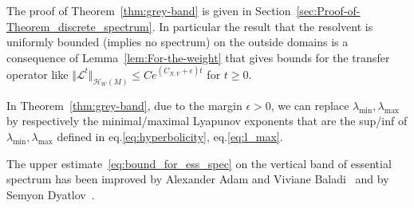 \documentclass[AHL,Unicode,longabstracts,published]{cedram}
\newcommand{\clH}{\mathcal{H}}
\newcommand{\clL}{\mathcal{L}}
\newcommand{\clH}{\mathcal{H}}
\begin{document}
The proof of Theorem~\ref{thm:grey-band} is given in Section~\ref{sec:Proof-of-Theorem_discrete_spectrum}. In particular the result that the resolvent is uniformly bounded (implies no spectrum) on the outside domains is a consequence of Lemma~\ref{lem:For-the-weight} that gives bounds for the transfer operator like $\Vert \clL^{t}\Vert _{\clH _{W}(M)}\leq Ce^{(C_{X,V}+\epsilon)t}$ for $t\geq0$.

\begin{rema}
In Theorem~\ref{thm:grey-band}, due to the margin $\epsilon>0$, we can replace $\lambda_{\min},\lambda_{\max}$ by respectively the minimal/maximal Lyapunov exponents that are the sup/inf of $\lambda_{\min},\lambda_{\max}$ defined in eq.\eqref{eq:hyperbolicity}, eq.\eqref{eq:l_max}.
\end{rema}


\begin{rema}
The upper estimate~\eqref{eq:bound_for_ess_spec} on the vertical band of essential spectrum has been improved by Alexander Adam and Viviane Baladi~\cite[eq.~(52)]{https://doi.org/10.48550/arxiv.1809.04062} and by Semyon Dyatlov~\cite[Theorem~2]{dyatlov_2021_pollicott_ruelle_sobolev}.
\end{rema}
\end{document}
